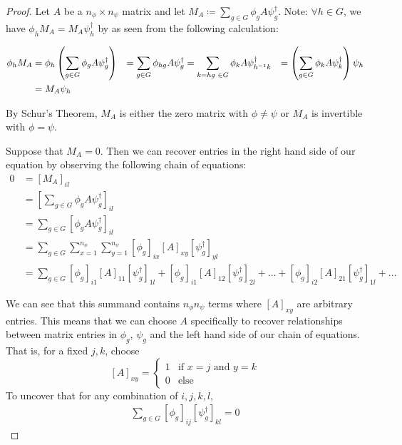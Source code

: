 \begin{proof} Let $A$ be a $n_\phi \times n_\psi$ matrix and let $M_A \coloneq \sum_{g\in G} \phi_{g} A \psi_g^{\dag}$. Note: $\forall h \in G$, we have $\phi_h M_A  = M_A \psi_h^\dag$ by as seen from the following calculation:

\begin{equation}
	\begin{aligned}
		\phi_h M_A &=  \phi_h \left(\sum_{g\in G} \phi_{g} A \psi_g^{\dag}\right) &= \sum_{g\in G} \phi_{hg} A \psi_g^{\dag} &= \sum_{k = hg \hspace{1mm} \in G} \phi_k A \psi_{h^{-1}k}^{\dag} &= \left(\sum_{g\in G} \phi_{k} A \psi_k^{\dag} \right)\psi_h \\ &= M_A\psi_h 
	\end{aligned}
\end{equation}

By Schur's Theorem, $M_A$ is either the zero matrix with $\phi \neq \psi$ or $M_A$ is invertible with $\phi=\psi$. 

Suppose that $M_A = 0$. Then we can recover entries in the right hand side of our equation by observing the following chain of equations:
\begin{equation}
	\begin{aligned}
		    0 &= \left[M_A\right]_{il} \\ 
			&= \left[\sum_{g\in G} \phi_{g} A \psi_g^{\dag}\right]_{il} \\
			&= \sum_{g\in G} \left[\phi_{g} A \psi_g^{\dag}\right]_{il} \\
			&= \sum_{g\in G} \sum_{x=1}^{n_\phi} \sum_{y=1}^{n_\psi}\left[\phi_{g}\right]_{ix} \left[A\right]_{xy} \left[\psi_g^{\dag}\right]_{yl} \\
			&= \sum_{g\in G} \left[\phi_{g}\right]_{i1} \left[A\right]_{11} \left[\psi_g^{\dag}\right]_{1l} + \left[\phi_{g}\right]_{i1} \left[A\right]_{12} \left[\psi_g^{\dag}\right]_{2l} + \hdots + \left[\phi_{g}\right]_{i2} \left[A\right]_{21} \left[\psi_g^{\dag}\right]_{1l} + \hdots
	\end{aligned}
\end{equation}

We can see that this summand contains $n_\phi n_\psi$ terms where $[A]_{xy}$ are arbitrary entries. This means that we can choose $A$ specifically to recover relationships between matrix entries in $\phi_g$, $\psi_g$ and the left hand side of our chain of equations. That is, for a fixed $j,k$, choose $$[A]_{xy} = \begin{cases}
												1 & \text{if }x=j\text{ and } y=k \\
												0 & \text{else}
\end{cases}$$
To uncover that for any combination of $i,j,k,l,$
\begin{equation}
	\begin{aligned}
		\sum_{g\in G} \left[\phi_g\right]_{ij}\left[\psi^\dag_g\right]_{kl} = 0
	\end{aligned}
\end{equation}


\end{proof}
